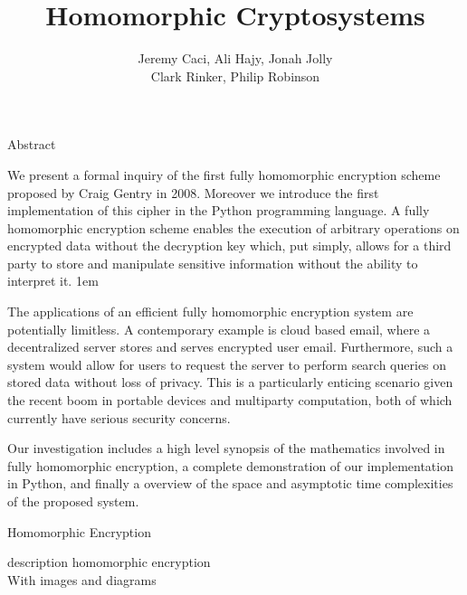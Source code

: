 \documentclass[a0,portrait]{a0poster}
\title{Homomorphic Cryptosystems}
\author{
Jeremy Caci, Ali Hajy, Jonah Jolly\\
Clark Rinker, Philip Robinson
}
\begin{document}
\maketitle



\begin{multicols}{2}
\begin{slide}{Abstract}

We present a formal inquiry of the first fully homomorphic encryption scheme proposed by Craig Gentry in 2008. Moreover we introduce the first implementation of this cipher in the Python programming language. A fully homomorphic encryption scheme enables the execution of arbitrary operations on encrypted data without the decryption key which, put simply, allows for a third party to  store and manipulate sensitive information without the ability to interpret it. 
\parskip 1em

The applications of an efficient fully homomorphic encryption system are potentially limitless. A contemporary example is cloud based email, where a decentralized server stores and serves encrypted user email. Furthermore, such a system would allow for users to request the server to perform search queries on stored data without loss of privacy. This is a particularly enticing scenario given the recent boom in portable devices and multiparty computation, both of which currently have serious security concerns. 

Our investigation includes a high level synopsis of the mathematics involved in fully homomorphic encryption, a complete demonstration of our implementation in Python, and finally a overview of the space and asymptotic time complexities of the proposed system. 

\end{slide}

\begin{slide}{Homomorphic Encryption}
 \centerline{description homomorphic encryption \\ With images and diagrams}

\end{slide}

\end{multicols}
\end{document}

